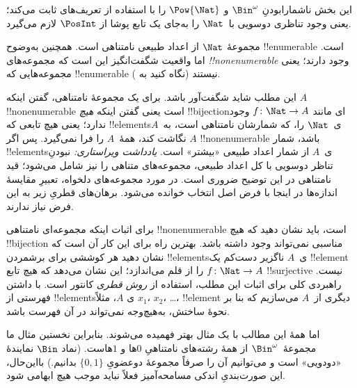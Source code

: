\documentclass[../../../include/open-logic-section]{subfiles}
\begin{document}


\begin{editorial}
  این بخش ناشمارابودنِ $\Bin^\omega$ و $\Pow{\Nat}$ را با استفاده از
  تعریف‌های  ثابت می‌کند؛ یعنی وجود تناظری دوسویی
  با~$\Nat$ را به‌جای یک تابع پوشا از $\PosInt$ لازم می‌گیرد.
\end{editorial}

\begin{explain}
مجموعهٔ $\Nat$ از اعداد طبیعی نامتناهی است. همچنین به‌وضوح
!!{enumerable} است. اما واقعیت شگفت‌انگیز این است که مجموعه‌های
\emph{!!{nonenumerable}} وجود دارند؛ یعنی مجموعه‌هایی که !!{enumerable}
نیستند (نگاه کنید به ).

این مطلب شاید شگفت‌آور باشد. برای یک مجموعهٔ نامتناهی، گفتن اینکه $A$
!!{nonenumerable} است یعنی گفتن اینکه \emph{هیچ} !!{bijection}‌ای مانند $f
\colon \Nat \to A$ وجود ندارد؛ یعنی هیچ تابعی که !!{element}sی~$\Nat$
را، که شمارشان نامتناهی است، به~$A$ نگاشت کند، همهٔ~$A$ را فرا نمی‌گیرد. پس اگر
$A$ !!{nonenumerable} باشد، شمار !!{element}sی~$A$ از شمار اعداد طبیعی
«بیشتر» است.
\emph{یادداشت ویراستاری:} نبودنِ تناظر دوسویی با کل اعداد طبیعی،
مجموعه‌های متناهی را نیز شامل می‌شود؛ قید نامتناهی در این توضیح ضروری است.
در مورد مجموعه‌های دلخواه، تعبیرِ مقایسهٔ اندازه‌ها در اینجا با فرض اصل
انتخاب خوانده می‌شود. برهان‌های قطریِ زیر به این فرض نیاز ندارند.

برای اثبات اینکه مجموعه‌ای نامتناهی !!{nonenumerable} است، باید نشان دهید که هیچ
!!{bijection} مناسبی نمی‌تواند وجود داشته باشد. بهترین راه برای این کار
آن است که نشان دهید هر کوششی برای برشمردن !!{element}sی~$A$ ناگزیر
دست‌کم یک !!{element} را از قلم می‌اندازد؛ این نشان می‌دهد که هیچ تابع
$f\colon \Nat \to A$ !!{surjective} نیست. راهبردی کلی برای اثبات این
مطلب، استفاده از \emph{روش قطری} کانتور است. با داشتن فهرستی از
!!{element}sی $A$، مثلاً $x_1$، $x_2$، \dots، !!{element} دیگری از~$A$
می‌سازیم که بنا بر نحوهٔ ساختش، به‌هیچ‌وجه نمی‌تواند در آن فهرست باشد.

اما همهٔ این مطالب با یک مثال بهتر فهمیده می‌شوند. بنابراین نخستین مثال
ما مجموعهٔ~$\Bin^\omega$ از همهٔ رشته‌های نامتناهیِ $0$ها و $1$هاست.
(نماد $\Bin$ نمایندهٔ «دودویی» است و می‌توانیم آن را صرفاً مجموعهٔ دوعضویِ
$\{0,1\}$ بدانیم.)
بااین‌حال، این صورت‌بندیِ اندکی مسامحه‌آمیز فعلاً نباید موجب هیچ ابهامی شود.
\end{explain}
\end{document}
